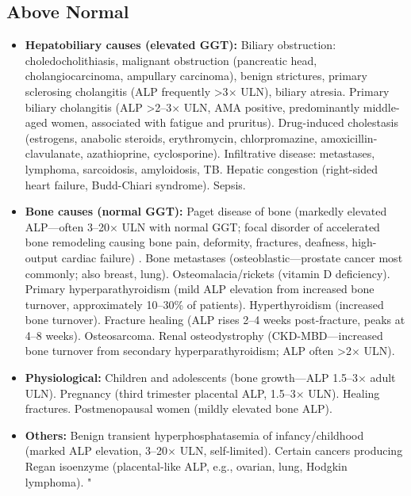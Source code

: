 \subsection*{Above Normal}
\begin{itemize}
  \item \textbf{Hepatobiliary causes (elevated GGT):} Biliary obstruction: choledocholithiasis, malignant obstruction (pancreatic head, cholangiocarcinoma, ampullary carcinoma), benign strictures, primary sclerosing cholangitis (ALP frequently >3$\times$ ULN), biliary atresia. Primary biliary cholangitis (ALP >2--3$\times$ ULN, AMA positive, predominantly middle-aged women, associated with fatigue and pruritus). Drug-induced cholestasis (estrogens, anabolic steroids, erythromycin, chlorpromazine, amoxicillin-clavulanate, azathioprine, cyclosporine). Infiltrative disease: metastases, lymphoma, sarcoidosis, amyloidosis, TB. Hepatic congestion (right-sided heart failure, Budd-Chiari syndrome). Sepsis.
  \item \textbf{Bone causes (normal GGT):} Paget disease of bone (markedly elevated ALP---often 3--20$\times$ ULN with normal GGT; focal disorder of accelerated bone remodeling causing bone pain, deformity, fractures, deafness, high-output cardiac failure) \cite{ralston2008pathogenesis}. Bone metastases (osteoblastic---prostate cancer most commonly; also breast, lung). Osteomalacia/rickets (vitamin D deficiency). Primary hyperparathyroidism (mild ALP elevation from increased bone turnover, approximately 10--30\% of patients). Hyperthyroidism (increased bone turnover). Fracture healing (ALP rises 2--4 weeks post-fracture, peaks at 4--8 weeks). Osteosarcoma. Renal osteodystrophy (CKD-MBD---increased bone turnover from secondary hyperparathyroidism; ALP often >2$\times$ ULN).
  \item \textbf{Physiological:} Children and adolescents (bone growth---ALP 1.5--3$\times$ adult ULN). Pregnancy (third trimester placental ALP, 1.5--3$\times$ ULN). Healing fractures. Postmenopausal women (mildly elevated bone ALP).
  \item \textbf{Others:} Benign transient hyperphosphatasemia of infancy/childhood (marked ALP elevation, 3--20$\times$ ULN, self-limited). Certain cancers producing Regan isoenzyme (placental-like ALP, e.g., ovarian, lung, Hodgkin lymphoma). "
\end{itemize}

